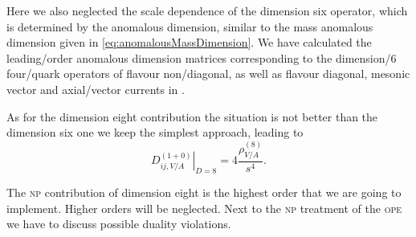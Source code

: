 \documentclass[../../index.tex]{subfiles}
\begin{document}
Here we also neglected the scale dependence of the dimension six operator, which
is determined by the anomalous dimension, similar to the mass anomalous
dimension given in \cref{eq:anomalousMassDimension}. We have calculated the
leading\-/order anomalous dimension matrices corresponding to the dimension\-/6
four\-/quark operators of flavour non\-/diagonal, as well as flavour diagonal,
mesonic vector and axial\-/vector currents in \cite{Boito2015}.

As for the dimension eight contribution the situation is not better than the
dimension six one we keep the simplest approach, leading to
\begin{equation}
  \left. D_{ij,V/A}^{(1+0)} \right\rvert_{D=8} = 4 \frac{\rho_{V/A}^{(8)}}{s^4}.
\end{equation}

The \textsc{np} contribution of dimension eight is the highest order that we are
going to implement. Higher orders will be neglected. Next to the \textsc{np}
treatment of the \textsc{ope} we have to discuss possible duality violations.
\end{document}
